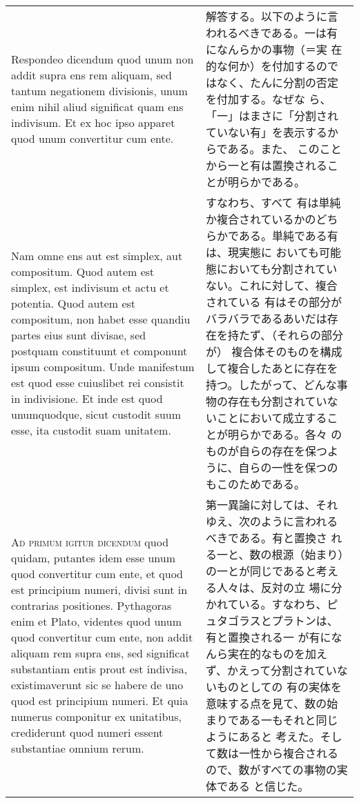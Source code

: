 \documentclass[10pt]{jsarticle} %
\begin{document}
\begin{longtable}{p{21em}p{21em}}
\\

{\sc Respondeo dicendum} quod unum non addit supra ens rem aliquam,
sed tantum negationem divisionis, unum enim nihil aliud significat
quam ens indivisum. Et ex hoc ipso apparet quod unum convertitur cum
ente.

&

解答する。以下のように言われるべきである。一は有になんらかの事物（＝実
在的な何か）を付加するのではなく、たんに分割の否定を付加する。なぜな
ら、「一」はまさに「分割されていない有」を表示するからである。また、
このことから一と有は置換されることが明らかである。


\\

Nam omne ens aut est simplex, aut compositum. Quod autem est
simplex, est indivisum et actu et potentia. Quod autem est compositum,
non habet esse quandiu partes eius sunt divisae, sed postquam
constituunt et componunt ipsum compositum. Unde manifestum est quod
esse cuiuslibet rei consistit in indivisione. Et inde est quod
unumquodque, sicut custodit suum esse, ita custodit suam unitatem.

&

すなわち、すべて
有は単純か複合されているかのどちらかである。単純である有は、現実態に
おいても可能態においても分割されていない。これに対して、複合されている
有はその部分がバラバラであるあいだは存在を持たず、（それらの部分が）
複合体そのものを構成して複合したあとに存在を持つ。したがって、どんな事
物の存在も分割されていないことにおいて成立することが明らかである。各々
のものが自らの存在を保つように、自らの一性を保つのもこのためである。

\\


{\scshape Ad primum igitur dicendum} quod quidam, putantes idem esse
unum quod convertitur cum ente, et quod est principium numeri, divisi
sunt in contrarias positiones. Pythagoras enim et Plato, videntes quod
unum quod convertitur cum ente, non addit aliquam rem supra ens, sed
significat substantiam entis prout est indivisa, existimaverunt sic se
habere de uno quod est principium numeri. Et quia numerus componitur ex
unitatibus, crediderunt quod numeri essent substantiae omnium rerum.

&

第一異論に対しては、それゆえ、次のように言われるべきである。有と置換さ
れる一と、数の根源（始まり）の一とが同じであると考える人々は、反対の立
場に分かれている。すなわち、ピュタゴラスとプラトンは、有と置換される一
が有になんら実在的なものを加えず、かえって分割されていないものとしての
有の実体を意味する点を見て、数の始まりである一もそれと同じようにあると
考えた。そして数は一性から複合されるので、数がすべての事物の実体である
と信じた。


\end{longtable}
\end{document}
